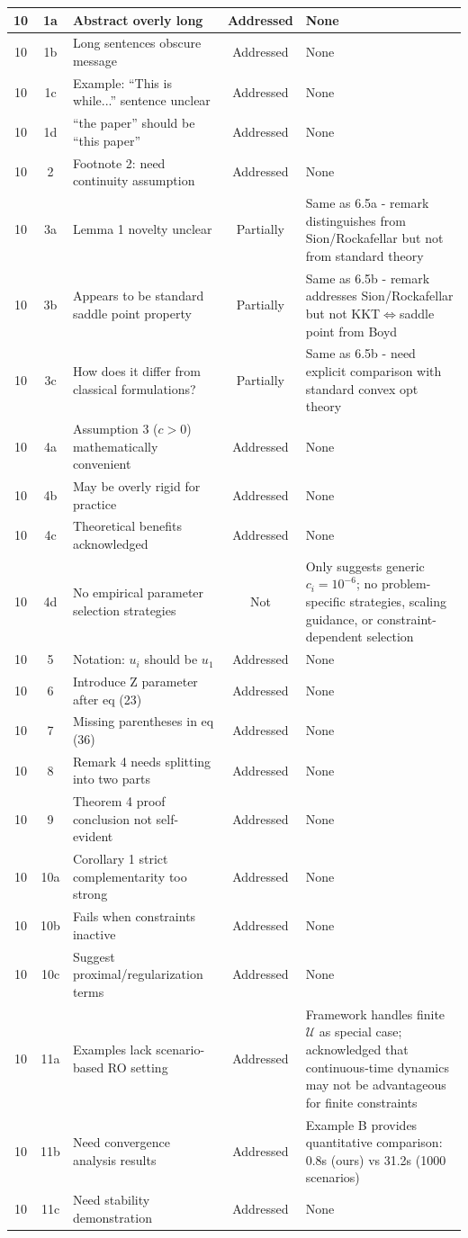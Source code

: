 \documentclass[journal,twoside,web]{ieeecolor}
\begin{document}
\begin{longtable}{|c|c|p{5.5cm}|c|p{3.5cm}|}
10 & 1a & Abstract overly long & Addressed & None \\
\hline
10 & 1b & Long sentences obscure message & Addressed & None \\
\hline
10 & 1c & Example: ``This is while...'' sentence unclear & Addressed & None \\
\hline
10 & 1d & ``the paper'' should be ``this paper'' & Addressed & None \\
\hline
10 & 2 & Footnote 2: need continuity assumption & Addressed & None \\
\hline
10 & 3a & Lemma 1 novelty unclear & Partially & Same as 6.5a - remark distinguishes from Sion/Rockafellar but not from standard theory \\
\hline
10 & 3b & Appears to be standard saddle point property & Partially & Same as 6.5b - remark addresses Sion/Rockafellar but not KKT$\Leftrightarrow$saddle point from Boyd \\
\hline
10 & 3c & How does it differ from classical formulations? & Partially & Same as 6.5b - need explicit comparison with standard convex opt theory \\
\hline
10 & 4a & Assumption 3 ($c>0$) mathematically convenient & Addressed & None \\
\hline
10 & 4b & May be overly rigid for practice & Addressed & None \\
\hline
10 & 4c & Theoretical benefits acknowledged & Addressed & None \\
\hline
10 & 4d & No empirical parameter selection strategies & Not & Only suggests generic $c_i=10^{-6}$; no problem-specific strategies, scaling guidance, or constraint-dependent selection \\
\hline
10 & 5 & Notation: $u_i$ should be $u_1$ & Addressed & None \\
\hline
10 & 6 & Introduce Z parameter after eq (23) & Addressed & None \\
\hline
10 & 7 & Missing parentheses in eq (36) & Addressed & None \\
\hline
10 & 8 & Remark 4 needs splitting into two parts & Addressed & None \\
\hline
10 & 9 & Theorem 4 proof conclusion not self-evident & Addressed & None \\
\hline
10 & 10a & Corollary 1 strict complementarity too strong & Addressed & None \\
\hline
10 & 10b & Fails when constraints inactive & Addressed & None \\
\hline
10 & 10c & Suggest proximal/regularization terms & Addressed & None \\
\hline
10 & 11a & Examples lack scenario-based RO setting & Addressed & Framework handles finite $\mathcal{U}$ as special case; acknowledged that continuous-time dynamics may not be advantageous for finite constraints \\
\hline
10 & 11b & Need convergence analysis results & Addressed & Example B provides quantitative comparison: 0.8s (ours) vs 31.2s (1000 scenarios) \\
\hline
10 & 11c & Need stability demonstration & Addressed & None \\
\hline


\end{longtable}
\end{document}
